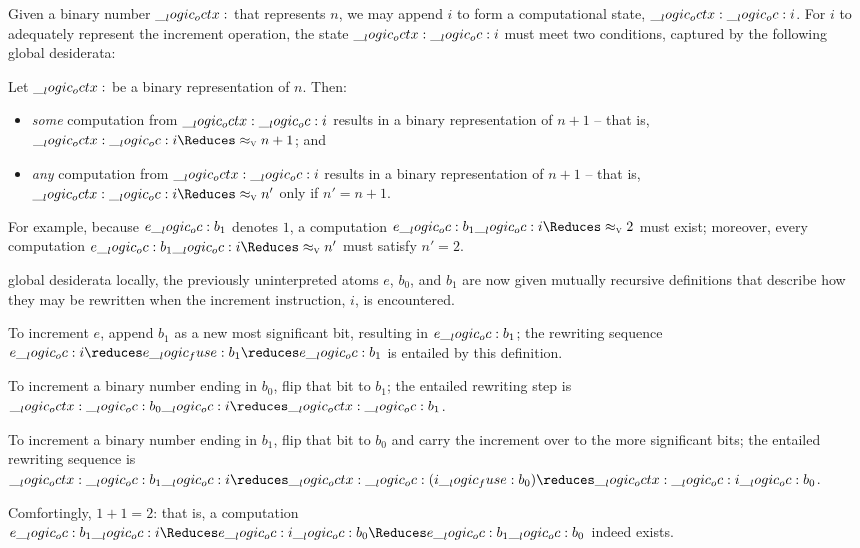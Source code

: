 Given a binary number $\__logic_octx:$ that represents $n$, we may append $i$ to form a computational state, $\__logic_octx: \__logic_oc: i$.
For $i$ to adequately represent the increment operation, the state $\__logic_octx: \__logic_oc: i$ must meet two conditions, captured by the following global desiderata:
\begin{theorem}\label{thm:increment-structural-adequacy}
  Let $\__logic_octx:$ be a binary representation of $n$.
  Then:
  \begin{itemize}[nosep]
  \item
    \emph{some} computation from $\__logic_octx: \__logic_oc: i$ results in a binary representation of $n+1$ -- that is, $\octx \oc i \Reduces\aval{}{n+1}$; and
  \item
    \emph{any} computation from $\__logic_octx: \__logic_oc: i$ results in a binary representation of $n+1$ -- that is, $\octx \oc i \Reduces\aval{}{n'}$ only if $n' = n+1$.%
  \end{itemize}
\end{theorem}
\noindent
For example, because $e \__logic_oc: b_1$ denotes $1$, a computation $e \oc b_1 \oc i \Reduces\aval{}{2}$ must exist; moreover, every computation $e \oc b_1 \oc i \Reduces\aval{}{n'}$ must satisfy $n' = 2$.

 global desiderata locally, the previously uninterpreted atoms $e$, $b_0$, and $b_1$ are now given mutually recursive definitions that describe how they may be rewritten when the increment instruction, $i$, is encountered.
\begin{description}[font=\color{structure}]
\item[$e \defd e \fuse b_1 \pmir i$]
  To increment $e$, append $b_1$ as a new most significant bit, resulting in $e \__logic_oc: b_1$;
  the rewriting sequence $e \oc i \reduces e \fuse b_1 \reduces e \oc b_1$ is entailed by this definition.
\item[$b_0 \defd b_1 \pmir i$]
  To increment a binary number ending in $b_0$, flip that bit to $b_1$;
  the entailed rewriting step is $\octx \oc b_0 \oc i \reduces \octx \oc b_1$.
\item[$b_1 \defd i \fuse b_0 \pmir i$]
  To increment a binary number ending in $b_1$, flip that bit to $b_0$ and carry the increment over to the more significant bits;
  the entailed rewriting sequence is $\octx \oc b_1 \oc i \reduces \octx \oc (i \fuse b_0) \reduces \octx \oc i \oc b_0$.
\end{description}
Comfortingly, $1+1 = 2$: that is, a computation
$e \oc b_1 \oc i \Reduces e \oc i \oc b_0 \Reduces e \oc b_1 \oc b_0$ indeed exists.

